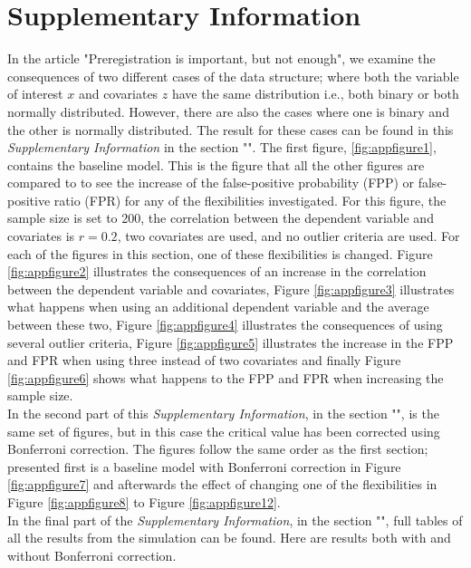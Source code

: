 \section{Supplementary Information} 
\setcounter{table}{0}
\setcounter{figure}{0}
\renewcommand*{\thepage}{\arabic{page}}
\renewcommand{\thetable}{S\arabic{table}}
\renewcommand{\thefigure}{S\arabic{figure}}

In the article "Preregistration is important, but not enough", we examine the consequences of two different cases of the data structure; where both the variable of interest $x$ and covariates $z$ have the same distribution i.e., both binary or both normally distributed. However, there are also the cases where one is binary and the other is normally distributed. The result for these cases can be found in this \textit{Supplementary Information} in the section "". The first figure, \ref{fig:appfigure1}, contains the baseline model. This is the figure that all the other figures are compared to to see the increase of the false-positive probability (FPP) or false-positive ratio (FPR) for any of the flexibilities investigated. For this figure, the sample size is set to 200, the correlation between the dependent variable and covariates is $\textit{r}=0.2$, two covariates are used, and no outlier criteria are used. For each of the figures in this section, one of these flexibilities is changed. Figure \ref{fig:appfigure2} illustrates the consequences of an increase in the correlation between the dependent variable and covariates, Figure \ref{fig:appfigure3} illustrates what happens when using an additional dependent variable and the average between these two, Figure \ref{fig:appfigure4} illustrates the consequences of using several outlier criteria, Figure \ref{fig:appfigure5} illustrates the increase in the FPP and FPR when using three instead of two covariates and finally Figure \ref{fig:appfigure6} shows what happens to the FPP and FPR when increasing the sample size.  \\

In the second part of this \textit{Supplementary Information}, in the section "", is the same set of figures, but in this case the critical value has been corrected using Bonferroni correction. The figures follow the same order as the first section; presented first is a baseline model with Bonferroni correction in Figure \ref{fig:appfigure7} and afterwards the effect of changing one of the flexibilities in Figure \ref{fig:appfigure8} to Figure \ref{fig:appfigure12}. \\
In the final part of the \textit{Supplementary Information}, in the section "", full tables of all the results from the simulation can be found. Here are  results both with and without Bonferroni correction.\\
\newpage

